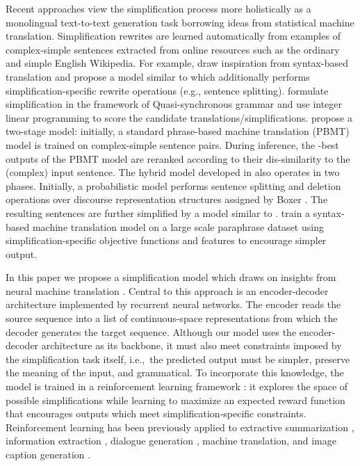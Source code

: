 \documentclass[11pt,letterpaper]{article}
\begin{document}
Recent approaches view the simplification process more holistically as
a monolingual text-to-text generation task borrowing ideas from
statistical machine translation. Simplification rewrites are learned
automatically from examples of complex-simple sentences extracted from
online resources such as the ordinary and simple English
Wikipedia. For example,  draw inspiration
from syntax-based translation and propose a model similar to
 which additionally performs
simplification-specific rewrite operations (e.g., sentence
splitting).  formulate
simplification in the framework of Quasi-synchronous grammar
\cite{smith2006quasi} and use integer linear programming to score the
candidate translations/simplifications. 
propose a two-stage model: initially, a standard phrase-based machine
translation (PBMT) model is trained on complex-simple sentence
pairs. During inference, the -best outputs of the PBMT model are
reranked according to their dis-similarity to the (complex) input
sentence. The hybrid model developed in 
also operates in two phases.  Initially, a probabilistic model
performs sentence splitting and deletion operations over discourse
representation structures assigned by Boxer
\cite{curran-clark-bos:2007:PosterDemo}.  The resulting sentences are
further simplified by a model similar to .
 train a syntax-based machine translation model on
a large scale paraphrase dataset \cite{ganitkevitch2013ppdb} using
simplification-specific objective functions and features to encourage
simpler output.



In this paper we propose a simplification model which draws on
insights from neural machine translation
\cite{bahdanau2014neural,sutskever2014sequence}.  Central to this
approach is an encoder-decoder architecture implemented by recurrent
neural networks.  The encoder reads the source sequence into a list of
continuous-space representations from which the decoder generates the
target sequence. Although our model uses the encoder-decoder
architecture as its backbone, it must also meet constraints imposed by
the simplification task itself, i.e.,~the predicted output must be
simpler, preserve the meaning of the input, and grammatical. To
incorporate this knowledge, the model is trained in a reinforcement
learning framework \cite{williams1992simple}: it explores the space of
possible simplifications while learning to maximize an expected reward
function that encourages outputs which meet simplification-specific
constraints. Reinforcement learning has been previously applied to
extractive summarization \cite{ryang-abekawa:2012:EMNLP}, information
extraction \cite{narasimhan:2016:EMNLP2016}, dialogue generation
\cite{li-EtAl:2016:EMNLP}, machine translation, and image caption
generation \cite{ranzato2016sequence}.
\end{document}
